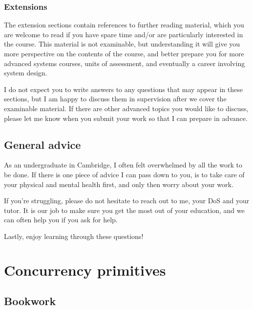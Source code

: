 \documentclass[12pt,a4paper,oneside,openright]{report}
\begin{document}
\subsection*{Extensions}

The extension sections contain references to further reading material,
which you are welcome to read if you have spare time and/or are
particularly interested in the course. This material is not
examinable, but understanding it will give you more perspective on the
contents of the course, and better prepare you for more advanced
systems courses, units of assessment, and eventually a career
involving system design.

I do not expect you to write answers to any questions that may appear
in these sections, but I am happy to discuss them in supervision after
we cover the examinable material. If there are other advanced topics
you would like to discuss, please let me know when you submit your
work so that I can prepare in advance.

\section*{General advice}

As an undergraduate in Cambridge, I often felt overwhelmed by all the
work to be done. If there is one piece of advice I can pass down to
you, is to take care of your physical and mental health first, and
only then worry about your work.

If you're struggling, please do not hesitate to reach out to me, your
DoS and your tutor. It is our job to make sure you get the most out of
your education, and we can often help you if you ask for help.

Lastly, enjoy learning through these questions!

\newpage

\tableofcontents



\chapter{Concurrency primitives}
\pagestyle{headings} 

\section{Bookwork}
\end{document}
